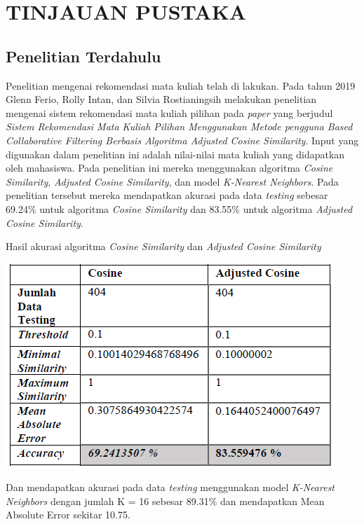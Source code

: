 \section{TINJAUAN PUSTAKA}

\subsection{Penelitian Terdahulu}
Penelitian mengenai rekomendasi mata kuliah telah di lakukan. Pada tahun 2019 Glenn Ferio, Rolly Intan, dan Silvia Rostianingsih melakukan
penelitian mengenai sistem rekomendasi mata kuliah pilihan pada \emph{paper} yang berjudul
\emph{Sistem Rekomendasi Mata Kuliah Pilihan Menggunakan Metode pengguna Based Collaborative Filtering Berbasis Algoritma Adjusted Cosine Similarity}.
Input yang digunakan dalam penelitian ini adalah nilai-nilai mata kuliah yang didapatkan oleh mahasiswa. Pada penelitian ini mereka menggunakan algoritma
\emph{Cosine Similarity}, \emph{Adjusted Cosine Similarity}, dan model \emph{K-Nearest Neighbors}. Pada penelitian tersebut mereka mendapatkan akurasi
pada data \emph{testing} sebesar 69.24\% untuk algoritma \emph{Cosine Similarity} dan 83.55\% untuk algoritma \emph{Adjusted Cosine Similarity}.

\begin{table} [ht] \centering
  \caption{Hasil akurasi algoritma \emph{Cosine Similarity} dan \emph{Adjusted Cosine Similarity} \citep{cosineSimilarity}}
  \vspace*{3mm}
  \includegraphics{gambar/akurasi-algoritma-cosine-similarity.png}
\end{table}

Dan mendapatkan akurasi pada data \emph{testing} menggunakan model \emph{K-Nearest Neighbors} dengan jumlah K = 16 sebesar 89.31\%
dan mendapatkan Mean Absolute Error sekitar 10.75.

